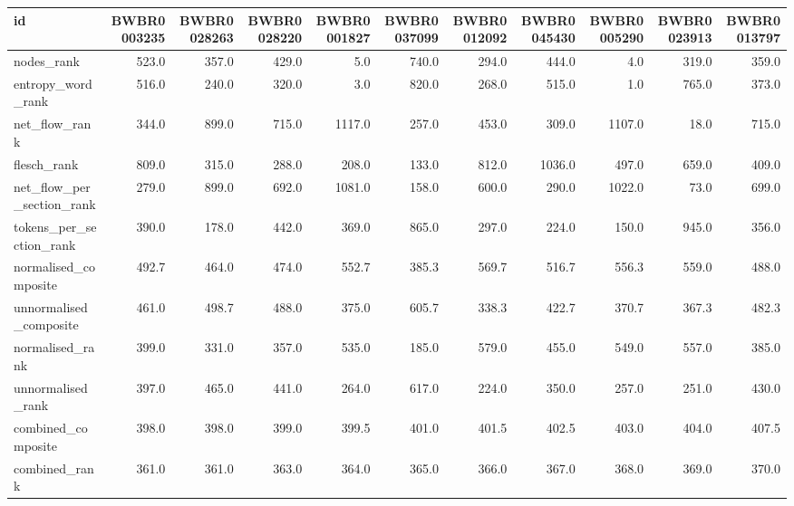 \begin{tabular}{lrrrrrrrrrr}
\toprule
id & BWBR0003235 & BWBR0028263 & BWBR0028220 & BWBR0001827 & BWBR0037099 & BWBR0012092 & BWBR0045430 & BWBR0005290 & BWBR0023913 & BWBR0013797 \\
\midrule
nodes\_rank & 523.0 & 357.0 & 429.0 & 5.0 & 740.0 & 294.0 & 444.0 & 4.0 & 319.0 & 359.0 \\
\cline{1-11}
entropy\_word\_rank & 516.0 & 240.0 & 320.0 & 3.0 & 820.0 & 268.0 & 515.0 & 1.0 & 765.0 & 373.0 \\
\cline{1-11}
net\_flow\_rank & 344.0 & 899.0 & 715.0 & 1117.0 & 257.0 & 453.0 & 309.0 & 1107.0 & 18.0 & 715.0 \\
\cline{1-11}
flesch\_rank & 809.0 & 315.0 & 288.0 & 208.0 & 133.0 & 812.0 & 1036.0 & 497.0 & 659.0 & 409.0 \\
\cline{1-11}
net\_flow\_per\_section\_rank & 279.0 & 899.0 & 692.0 & 1081.0 & 158.0 & 600.0 & 290.0 & 1022.0 & 73.0 & 699.0 \\
\cline{1-11}
tokens\_per\_section\_rank & 390.0 & 178.0 & 442.0 & 369.0 & 865.0 & 297.0 & 224.0 & 150.0 & 945.0 & 356.0 \\
\cline{1-11}
normalised\_composite & 492.7 & 464.0 & 474.0 & 552.7 & 385.3 & 569.7 & 516.7 & 556.3 & 559.0 & 488.0 \\
\cline{1-11}
unnormalised\_composite & 461.0 & 498.7 & 488.0 & 375.0 & 605.7 & 338.3 & 422.7 & 370.7 & 367.3 & 482.3 \\
\cline{1-11}
normalised\_rank & 399.0 & 331.0 & 357.0 & 535.0 & 185.0 & 579.0 & 455.0 & 549.0 & 557.0 & 385.0 \\
\cline{1-11}
unnormalised\_rank & 397.0 & 465.0 & 441.0 & 264.0 & 617.0 & 224.0 & 350.0 & 257.0 & 251.0 & 430.0 \\
\cline{1-11}
combined\_composite & 398.0 & 398.0 & 399.0 & 399.5 & 401.0 & 401.5 & 402.5 & 403.0 & 404.0 & 407.5 \\
\cline{1-11}
combined\_rank & 361.0 & 361.0 & 363.0 & 364.0 & 365.0 & 366.0 & 367.0 & 368.0 & 369.0 & 370.0 \\
\cline{1-11}
\bottomrule
\end{tabular}
